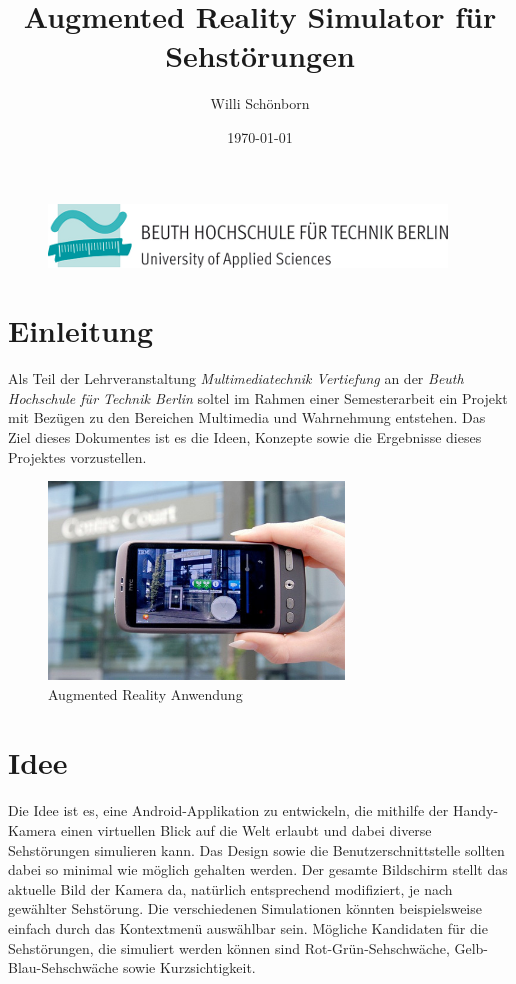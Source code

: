 \documentclass[a4paper]{article}
\title{Augmented Reality Simulator für Sehstörungen}
\author{Willi Schönborn}
\date{\today}
\begin{document}
\begin{figure}[H]
\centering
\includegraphics{beuth.png}
\maketitle
\end{figure}

\section*{Einleitung}
Als Teil der Lehrveranstaltung \textit{Multimediatechnik Vertiefung} an der \textit{Beuth Hochschule für Technik Berlin} soltel im Rahmen einer Semesterarbeit ein Projekt mit Bezügen zu den Bereichen Multimedia und Wahrnehmung entstehen. Das Ziel dieses Dokumentes ist es die Ideen, Konzepte sowie die Ergebnisse dieses Projektes vorzustellen.

\begin{figure}[H]
\centering
\includegraphics[width=0.7\textwidth]{augmented-reality.jpg}
\caption{Augmented Reality Anwendung}
\end{figure}

\section*{Idee}

Die Idee ist es, eine Android-Applikation zu entwickeln, die mithilfe der Handy-Kamera einen virtuellen Blick auf die Welt erlaubt und dabei diverse Sehstörungen simulieren kann. Das Design sowie die Benutzerschnittstelle sollten dabei so minimal wie möglich gehalten werden. Der gesamte Bildschirm stellt das aktuelle Bild der Kamera da, natürlich entsprechend modifiziert, je nach gewählter Sehstörung. Die verschiedenen Simulationen könnten beispielsweise einfach durch das Kontextmenü auswählbar sein. Mögliche Kandidaten für die Sehstörungen, die simuliert werden können sind Rot-Grün-Sehschwäche, Gelb-Blau-Sehschwäche sowie Kurzsichtigkeit. 
\end{document}
